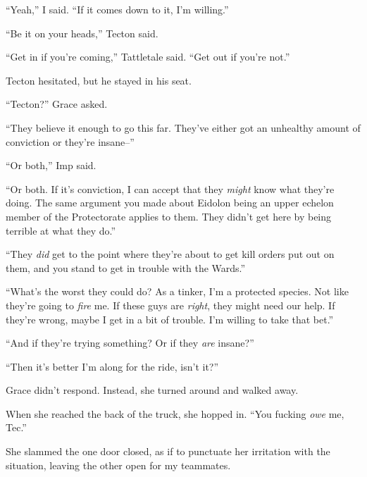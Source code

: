 ``Yeah,'' I said.  ``If it comes down to it, I'm willing.''



``Be it on your heads,'' Tecton said.



``Get in if you're coming,'' Tattletale said.  ``Get out if you're not.''



Tecton hesitated, but he stayed in his seat.



``Tecton?'' Grace asked.



``They believe it enough to go this far.  They've either got an unhealthy amount of conviction or they're insane--''



``Or both,'' Imp said.



``Or both.  If it's conviction, I can accept that they \emph{might} know what they're doing.  The same argument you made about Eidolon being an upper echelon member of the Protectorate applies to them.  They didn't get here by being terrible at what they do.''



``They \emph{did} get to the point where they're about to get kill orders put out on them, and you stand to get in trouble with the Wards.''



``What's the worst they could do?  As a tinker, I'm a protected species.  Not like they're going to \emph{fire} me.  If these guys are \emph{right}, they might need our help.  If they're wrong, maybe I get in a bit of trouble.  I'm willing to take that bet.''



``And if they're trying something?  Or if they \emph{are} insane?''



``Then it's better I'm along for the ride, isn't it?''



Grace didn't respond.  Instead, she turned around and walked away.



When she reached the back of the truck, she hopped in.  ``You fucking \emph{owe} me, Tec.''



She slammed the one door closed, as if to punctuate her irritation with the situation, leaving the other open for my teammates.



